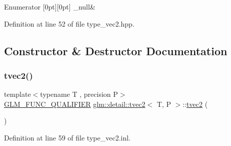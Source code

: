 \begin{DoxyEnumFields}{Enumerator}
[0pt][0pt]{}\mbox{\label{structglm_1_1detail_1_1tvec2_aa0bba0616f425fbd3fb5756aed326386a28f42778ba30ccaf6216792ddd25eed3}} 
\+\_\+null&\\
\hline

\end{DoxyEnumFields}


Definition at line 52 of file type\+\_\+vec2.\+hpp.



\subsection{Constructor \& Destructor Documentation}
\mbox{\label{structglm_1_1detail_1_1tvec2_a94b97e78eeef245abdc326056faa36a5}} 
\subsubsection{\texorpdfstring{tvec2()}{tvec2()}\hspace{0.1cm}{\footnotesize\ttfamily [1/15]}}
{\footnotesize\ttfamily template$<$typename T , precision P$>$ \\
\hyperlink{setup_8hpp_a33fdea6f91c5f834105f7415e2a64407}{G\+L\+M\+\_\+\+F\+U\+N\+C\+\_\+\+Q\+U\+A\+L\+I\+F\+I\+ER} \hyperlink{structglm_1_1detail_1_1tvec2}{glm\+::detail\+::tvec2}$<$ T, P $>$\+::\hyperlink{structglm_1_1detail_1_1tvec2}{tvec2} (\begin{DoxyParamCaption}{ }\end{DoxyParamCaption})}



Definition at line 59 of file type\+\_\+vec2.\+inl.

\mbox{\label{structglm_1_1detail_1_1tvec2_a764076eb651c2fd732122e24bb882dbf}} 
